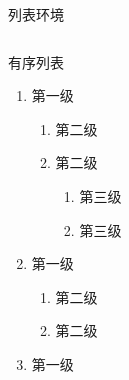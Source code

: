\documentclass[12pt]{beamer}
\begin{document}
\begin{frame}{列表环境}
\begin{columns}[T,onlytextwidth]
        \begin{column}{0.48\textwidth}
            \begin{block}{有序列表}
                \begin{enumerate}
                    \item 第一级
                    \begin{enumerate}
                        \item 第二级
                        \item 第二级
                        \begin{enumerate}
                            \item 第三级
                            \item 第三级
                        \end{enumerate}
                    \end{enumerate}
                    \item 第一级
                    \begin{enumerate}
                        \item 第二级
                        \item 第二级
                    \end{enumerate}
                    \item 第一级
                \end{enumerate}
            \end{block}
        \end{column}
    \end{columns}
\end{frame}
\end{document}
